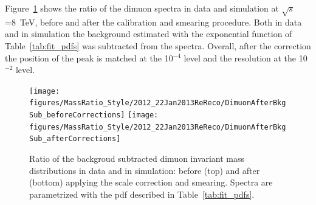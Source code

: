 Figure~\ref{fig:MassRatio_8TeV} shows the ratio of the dimuon spectra
in data and simulation at $\sqrt{s}$=8~TeV, before and after the calibration and smearing
procedure. Both in data and in simulation the background estimated with the exponential function of
Table~\ref{tab:fit_pdfs} was subtracted from the spectra. Overall, after the
correction the position of the peak is matched at the 10$^{-4}$ level
and the resolution at the 10$^{-2}$ level.
\begin{figure}[hbtp]  
\begin{center}
\texttt{[image: figures/MassRatio\_Style/2012\_22Jan2013ReReco/DimuonAfterBkgSub\_beforeCorrections]} 
\texttt{[image: figures/MassRatio\_Style/2012\_22Jan2013ReReco/DimuonAfterBkgSub\_afterCorrections]}
 \hspace{1cm} 
   \caption{Ratio of the backgroud subtracted dimuon
     invariant mass distributions in data and in simulation: before (top) and after
     (bottom) applying the scale correction and smearing.
     Spectra are parametrized with the pdf described in Table~\ref{tab:fit_pdfs}.
   \label{fig:MassRatio_8TeV}}
 \end{center}
\end{figure} 


